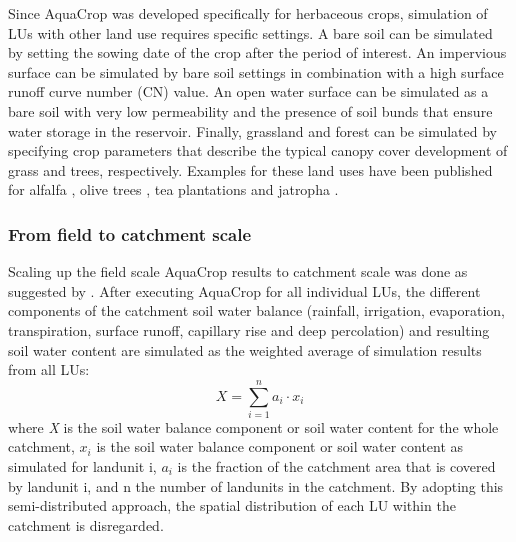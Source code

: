 Since AquaCrop was developed specifically for herbaceous crops, simulation of LUs with other land use requires specific settings. A bare soil can be simulated by setting the sowing date of the crop after the period of interest. An impervious surface can be simulated by bare soil settings in combination with a high surface runoff curve number (CN) value. An open water surface can be simulated as a bare soil with very low permeability and the presence of soil bunds that ensure water storage in the reservoir. Finally, grassland and forest can be simulated by specifying crop parameters that describe the typical canopy cover development of grass and trees, respectively. Examples for these land uses have been published for alfalfa \parencite{kim2015}, olive trees \parencite{rallo2012}, tea plantations \parencite{elbehri2015} and jatropha \parencite{segerstedt2013}. 

\subsubsection{From field to catchment scale}
Scaling up the field scale AquaCrop results to catchment scale was done as suggested by \textcite{wesseling2006}. After executing AquaCrop for all individual LUs, the different components of the catchment soil water balance (rainfall, irrigation, evaporation, transpiration, surface runoff, capillary rise and deep percolation) and resulting soil water content are simulated as the weighted average of simulation results from all LUs: 
\begin{equation}
 X=\sum_{i=1}^n a_i \cdot x_i
  \label{eq:ch6_SWBcatch}
\end{equation}
where \textit{X} is the soil water balance component or soil water content for the whole catchment, $x_i$ is the soil water balance component or soil water content as simulated for landunit i, $a_i$ is the fraction of the catchment area that is covered by landunit i, and n the number of landunits in the catchment. By adopting this semi-distributed approach, the spatial distribution of each LU within the catchment is disregarded.

